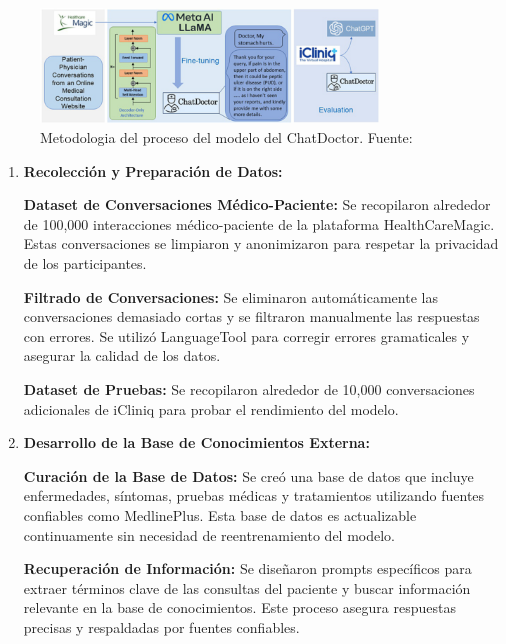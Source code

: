 	\begin{figure}[H]
		\begin{center}
			\includegraphics[width=0.8\textwidth]{2/1_antecedentes/Metodologia-7.png}
			\caption{Metodologia del proceso del modelo del ChatDoctor. Fuente: \cite{chatdoctor} }
		\end{center}
	\end{figure}
	\vspace{-10mm}
	\begin{enumerate}
		
		\item \textbf{Recolección y Preparación de Datos:}
			
			\subitem \textbf{Dataset de Conversaciones Médico-Paciente:} Se recopilaron alrededor de 100,000 interacciones médico-paciente de la plataforma HealthCareMagic. Estas conversaciones se limpiaron y anonimizaron para respetar la privacidad de los participantes.
			
			\subitem \textbf{Filtrado de Conversaciones: }Se eliminaron automáticamente las conversaciones demasiado cortas y se filtraron manualmente las respuestas con errores. Se utilizó LanguageTool para corregir errores gramaticales y asegurar la calidad de los datos.
				
			\subitem \textbf{Dataset de Pruebas:} Se recopilaron alrededor de 10,000 conversaciones adicionales de iCliniq para probar el rendimiento del modelo.
			
		\item \textbf{Desarrollo de la Base de Conocimientos Externa:}
			
			\subitem \textbf{Curación de la Base de Datos:} Se creó una base de datos que incluye enfermedades, síntomas, pruebas médicas y tratamientos utilizando fuentes confiables como MedlinePlus. Esta base de datos es actualizable continuamente sin necesidad de reentrenamiento del modelo.
			
			\subitem \textbf{Recuperación de Información:} Se diseñaron prompts específicos para extraer términos clave de las consultas del paciente y buscar información relevante en la base de conocimientos. Este proceso asegura respuestas precisas y respaldadas por fuentes confiables.
		

\end{enumerate}
